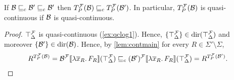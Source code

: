 \documentclass[a4paper,twoside,notitlepage,openright,11pt]{report}
\begin{document}



\begin{corollary}
  \label{lem:Tcont}
  If $\mathcal B\sqsubseteq_c\mathcal B'\sqsubseteq_c\mathcal B'$ then $T^\mathcal F_P(\mathcal B)\sqsubseteq_c T^\mathcal F_P(\mathcal B')$. In particular, $T^\mathcal F_P(\mathcal B)$ is quasi-continuous if $\mathcal B$ is quasi-continuous.
\end{corollary}
\begin{proof}
  $\top_\Delta^\mathcal F$ is quasi-continuous (\cref{ex:qclog1}). Hence, $\{\top_\Delta^\mathcal F\}\in\operatorname{dir}(\top_\Delta^\mathcal F)$ and moreover $\{\mathcal B'\}\in\operatorname{dir}(\mathcal B)$. Hence, by \cref{lem:contmain}
  for every $R\in\Sigma'\setminus\Sigma$,
  \begin{align*}
    R^{T^\mathcal F_P(\mathcal B)}&={\mathcal B^\mathcal F}\llbracket\lambda\overline x_R\ldotp F_R\rrbracket(\top_\Delta^\mathcal F)\sqsubseteq_c{(\mathcal B')^\mathcal F}\llbracket\lambda\overline x_R\ldotp F_R\rrbracket(\top_\Delta^\mathcal F)=R^{T^\mathcal F_P(\mathcal B')}.\qedhere
  \end{align*}
\end{proof}
\end{document}
